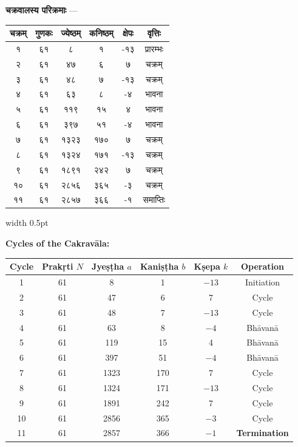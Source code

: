 \documentclass[11pt,a4paper]{article}
\newcommand{\dev}[1]{{\devanagarifont #1}}
\newcommand{\bilingual}[2]{%
  \par\vspace{0.5em}%
  \noindent\begin{minipage}[t]{0.47\textwidth}%
  \setlength{\parindent}{0pt}%
  \small #1%
  \end{minipage}%
  \hfill\textcolor{columnrule}{\vrule width 0.5pt}\hfill%
  \begin{minipage}[t]{0.47\textwidth}%
  \setlength{\parindent}{0pt}%
  \small\raggedright #2%
  \end{minipage}%
  \par\vspace{0.5em}%
}
\begin{document}
\bilingual{\textbf{चक्रवालस्य परिक्रमाः} —
\begin{center}
\begin{tabular}{|c|c|c|c|c|c|}
\hline
\textbf{\dev{चक्रम्}} & \textbf{\dev{गुणकः}} & \textbf{\dev{ज्येष्ठम्}} & \textbf{\dev{कनिष्ठम्}} & \textbf{\dev{क्षेपः}} & \textbf{\dev{वृत्तिः}} \\
\hline
\dev{१} & \dev{६१} & \dev{८} & \dev{१} & \dev{-१३} & \dev{प्रारम्भः} \\
\dev{२} & \dev{६१} & \dev{४७} & \dev{६} & \dev{७} & \dev{चक्रम्} \\
\dev{३} & \dev{६१} & \dev{४८} & \dev{७} & \dev{-१३} & \dev{चक्रम्} \\
\dev{४} & \dev{६१} & \dev{६३} & \dev{८} & \dev{-४} & \dev{भावना} \\
\dev{५} & \dev{६१} & \dev{११९} & \dev{१५} & \dev{४} & \dev{भावना} \\
\dev{६} & \dev{६१} & \dev{३९७} & \dev{५१} & \dev{-४} & \dev{भावना} \\
\dev{७} & \dev{६१} & \dev{१३२३} & \dev{१७०} & \dev{७} & \dev{चक्रम्} \\
\dev{८} & \dev{६१} & \dev{१३२४} & \dev{१७१} & \dev{-१३} & \dev{चक्रम्} \\
\dev{९} & \dev{६१} & \dev{१८९१} & \dev{२४२} & \dev{७} & \dev{चक्रम्} \\
\dev{१०} & \dev{६१} & \dev{२८५६} & \dev{३६५} & \dev{-३} & \dev{चक्रम्} \\
\dev{११} & \dev{६१} & \dev{२८५७} & \dev{३६६} & \dev{-१} & \dev{समाप्तिः} \\
\hline
\end{tabular}
\end{center}
}{%
\textbf{Cycles of the Cakrav\={a}la:}
\begin{center}
\begin{tabular}{|c|c|c|c|c|c|}
\hline
\textbf{Cycle} & \textbf{Prak\d{r}ti $N$} & \textbf{Jye\d{s}\d{t}ha $a$} & \textbf{Kani\d{s}\d{t}ha $b$} & \textbf{K\d{s}epa $k$} & \textbf{Operation} \\
\hline
1 & 61 & 8 & 1 & $-13$ & Initiation \\
2 & 61 & 47 & 6 & 7 & Cycle \\
3 & 61 & 48 & 7 & $-13$ & Cycle \\
4 & 61 & 63 & 8 & $-4$ & Bh\={a}van\={a} \\
5 & 61 & 119 & 15 & 4 & Bh\={a}van\={a} \\
6 & 61 & 397 & 51 & $-4$ & Bh\={a}van\={a} \\
7 & 61 & 1323 & 170 & 7 & Cycle \\
8 & 61 & 1324 & 171 & $-13$ & Cycle \\
9 & 61 & 1891 & 242 & 7 & Cycle \\
10 & 61 & 2856 & 365 & $-3$ & Cycle \\
11 & 61 & 2857 & 366 & $-1$ & \textbf{Termination} \\
\hline
\end{tabular}
\end{center}}
\end{document}
